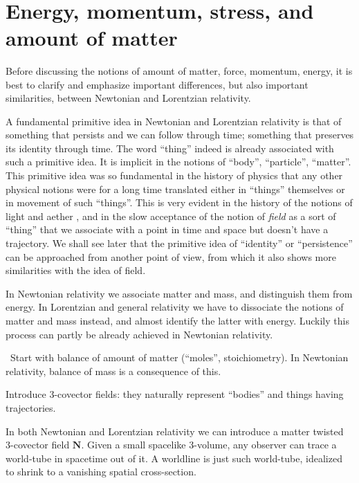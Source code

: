 \documentclass[\ifafour a4paper,12pt,\else a5paper,10pt,\fi%
onecolumn,oneside,article,%
british%
]{memoir}
\theoremstyle{remark}
\theoremstyle{innote}
\newcommand*{\wrench}{{\fontencoding{U}\fontfamily{fontawesomethree}\selectfont\symbol{114}}}
\newcommand{\mynotew}[1]{{\footnotesize\color{notecolour}\wrench\ #1}}
\renewcommand*{\|}[1][]{\nonscript\:#1\vert\nonscript\:\mathopen{}}
\newcommand*{\yN}{\bm{N}}
\begin{document}
\mynotew{}


\section{Energy, momentum, stress, and amount of matter}
\label{sec:stress_matter}

Before discussing the notions of amount of matter, force, momentum, energy, it is best to clarify and emphasize important differences, but also important similarities, between Newtonian and Lorentzian relativity.

\medskip

A fundamental primitive idea in Newtonian and Lorentzian relativity is that of something that persists and we can follow through time; something that preserves its identity through time. The word \enquote{thing} indeed is already associated with such a primitive idea. It is implicit in the notions of \enquote{body}, \enquote{particle}, \enquote{matter}. This primitive idea was so fundamental in the history of physics that any other physical notions were for a long time translated either in \enquote{things} themselves or in movement of such \enquote{things}. This is very evident in the history of the notions of light and aether \autocites{whittaker1910_r1951,whittaker1953}, and in the slow acceptance of the notion of \emph{field} as a sort of \enquote{thing} that we associate with a point in time and space but doesn't have a trajectory. We shall see later that the primitive idea of \enquote{identity} or \enquote{persistence} can be approached from another point of view, from which it also shows more similarities with the idea of field.

In Newtonian relativity we associate matter and mass, and distinguish them from energy. In Lorentzian and general relativity we have to dissociate the notions of matter and mass instead, and almost identify the latter with energy. Luckily this process can partly be already achieved in Newtonian relativity.


\mynotew{Start with balance of amount of matter (\enquote{moles}, stoichiometry). In Newtonian relativity, balance of mass is a consequence of this.

  Introduce 3-covector fields: they naturally represent \enquote{bodies} and things having trajectories.}

In both Newtonian and Lorentzian relativity we can introduce a matter twisted 3-covector field $\yN$. Given a small spacelike 3-volume, any observer can trace a world-tube in spacetime out of it. A worldline is just such world-tube, idealized to shrink to a vanishing spatial cross-section.
\end{document}
